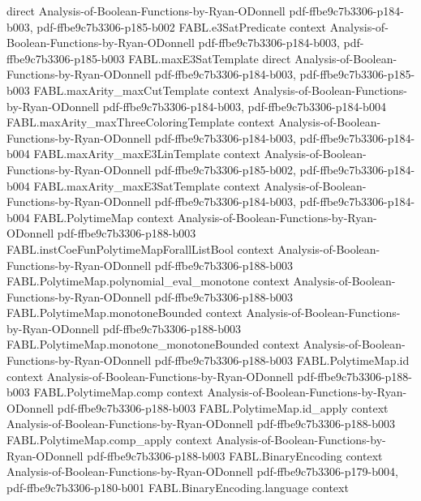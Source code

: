 \begin{theorem}
  {direct}
  {Analysis-of-Boolean-Functions-by-Ryan-ODonnell}
  {pdf-ffbe9c7b3306-p184-b003,
    pdf-ffbe9c7b3306-p185-b002}
\proofstep
  {FABL.e3SatPredicate}
  {context}
  {Analysis-of-Boolean-Functions-by-Ryan-ODonnell}
  {pdf-ffbe9c7b3306-p184-b003,
    pdf-ffbe9c7b3306-p185-b003}
\proofstep
  {FABL.maxE3SatTemplate}
  {direct}
  {Analysis-of-Boolean-Functions-by-Ryan-ODonnell}
  {pdf-ffbe9c7b3306-p184-b003,
    pdf-ffbe9c7b3306-p185-b003}
\proofstep
  {FABL.maxArity_maxCutTemplate}
  {context}
  {Analysis-of-Boolean-Functions-by-Ryan-ODonnell}
  {pdf-ffbe9c7b3306-p184-b003,
    pdf-ffbe9c7b3306-p184-b004}
\proofstep
  {FABL.maxArity_maxThreeColoringTemplate}
  {context}
  {Analysis-of-Boolean-Functions-by-Ryan-ODonnell}
  {pdf-ffbe9c7b3306-p184-b003,
    pdf-ffbe9c7b3306-p184-b004}
\proofstep
  {FABL.maxArity_maxE3LinTemplate}
  {context}
  {Analysis-of-Boolean-Functions-by-Ryan-ODonnell}
  {pdf-ffbe9c7b3306-p185-b002,
    pdf-ffbe9c7b3306-p184-b004}
\proofstep
  {FABL.maxArity_maxE3SatTemplate}
  {context}
  {Analysis-of-Boolean-Functions-by-Ryan-ODonnell}
  {pdf-ffbe9c7b3306-p184-b003,
    pdf-ffbe9c7b3306-p184-b004}
\proofstep
  {FABL.PolytimeMap}
  {context}
  {Analysis-of-Boolean-Functions-by-Ryan-ODonnell}
  {pdf-ffbe9c7b3306-p188-b003}
\proofstep
  {FABL.instCoeFunPolytimeMapForallListBool}
  {context}
  {Analysis-of-Boolean-Functions-by-Ryan-ODonnell}
  {pdf-ffbe9c7b3306-p188-b003}
\proofstep
  {FABL.PolytimeMap.polynomial_eval_monotone}
  {context}
  {Analysis-of-Boolean-Functions-by-Ryan-ODonnell}
  {pdf-ffbe9c7b3306-p188-b003}
\proofstep
  {FABL.PolytimeMap.monotoneBounded}
  {context}
  {Analysis-of-Boolean-Functions-by-Ryan-ODonnell}
  {pdf-ffbe9c7b3306-p188-b003}
\proofstep
  {FABL.PolytimeMap.monotone_monotoneBounded}
  {context}
  {Analysis-of-Boolean-Functions-by-Ryan-ODonnell}
  {pdf-ffbe9c7b3306-p188-b003}
\proofstep
  {FABL.PolytimeMap.id}
  {context}
  {Analysis-of-Boolean-Functions-by-Ryan-ODonnell}
  {pdf-ffbe9c7b3306-p188-b003}
\proofstep
  {FABL.PolytimeMap.comp}
  {context}
  {Analysis-of-Boolean-Functions-by-Ryan-ODonnell}
  {pdf-ffbe9c7b3306-p188-b003}
\proofstep
  {FABL.PolytimeMap.id_apply}
  {context}
  {Analysis-of-Boolean-Functions-by-Ryan-ODonnell}
  {pdf-ffbe9c7b3306-p188-b003}
\proofstep
  {FABL.PolytimeMap.comp_apply}
  {context}
  {Analysis-of-Boolean-Functions-by-Ryan-ODonnell}
  {pdf-ffbe9c7b3306-p188-b003}
\proofstep
  {FABL.BinaryEncoding}
  {context}
  {Analysis-of-Boolean-Functions-by-Ryan-ODonnell}
  {pdf-ffbe9c7b3306-p179-b004,
    pdf-ffbe9c7b3306-p180-b001}
\proofstep
  {FABL.BinaryEncoding.language}
  {context}

\end{theorem}

